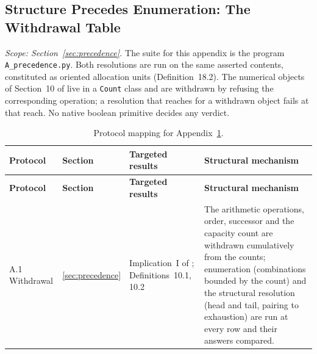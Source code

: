\documentclass[pdflatex,sn-mathphys-num]{sn-jnl}
\theoremstyle{thmstyleone}%
\theoremstyle{thmstyletwo}%
\theoremstyle{thmstylethree}%
\newcommand{\PA}{\cite{Swanagon2026PA}}
\begin{document}
\begin{appendices}
\section{Structure Precedes Enumeration: The Withdrawal Table}\label{app:A}
\emph{Scope: Section~\ref{sec:precedence}.} The suite for this appendix is the program \texttt{A\_precedence.py}. Both resolutions are run on the same asserted contents, constituted as oriented allocation units (Definition~18.2). The numerical objects of Section~10 of \PA{} live in a \texttt{Count} class and are withdrawn by refusing the corresponding operation; a resolution that reaches for a withdrawn object fails at that reach. No native boolean primitive decides any verdict.

\begingroup\small\renewcommand{\arraystretch}{1.3}
\begin{longtable}{@{} p{} p{} p{} p{} @{}}
\caption{Protocol mapping for Appendix~\ref{app:A}.}\label{tab:appA_mapping}\\
\toprule
\textbf{Protocol} & \textbf{Section} & \textbf{Targeted results} & \textbf{Structural mechanism} \\
\midrule
\endfirsthead
\toprule
\textbf{Protocol} & \textbf{Section} & \textbf{Targeted results} & \textbf{Structural mechanism} \\
\midrule
\endhead
\bottomrule
\endfoot
A.1 Withdrawal & \ref{sec:precedence} & Implication~I of \PA{}; Definitions~10.1, 10.2 & The arithmetic operations, order, successor and the capacity count are withdrawn cumulatively from the counts; enumeration (combinations bounded by the count) and the structural resolution (head and tail, pairing to exhaustion) are run at every row and their answers compared. \\
\end{longtable}\endgroup


\end{appendices}
\end{document}
